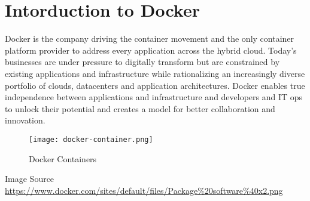 
\FILENAME

\section{Intorduction to Docker}
\label{Docker}

Docker is the company driving the container movement and the only
container platform provider to address every application across the
hybrid cloud. Today's businesses are under pressure to digitally
transform but are constrained by existing applications and
infrastructure while rationalizing an increasingly diverse portfolio of
clouds, datacenters and application architectures. Docker enables true
independence between applications and infrastructure and developers and
IT ops to unlock their potential and creates a model for better
collaboration and innovation.

\begin{figure}[htbp]
\centering
\texttt{[image: docker-container.png]}
\caption{Docker Containers}
\end{figure}

Image Source
\url{https://www.docker.com/sites/default/files/Package\%20software\%40x2.png}

